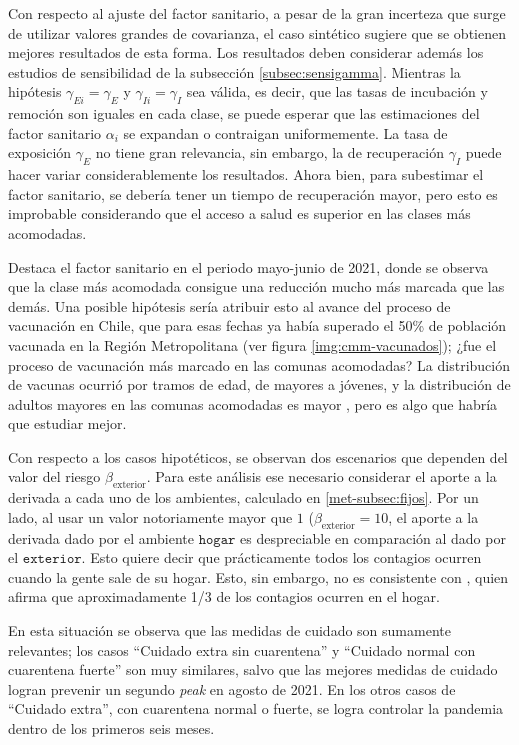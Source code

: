 Con respecto al ajuste del factor sanitario, a pesar de la gran incerteza que surge de utilizar valores grandes de covarianza, el caso sintético sugiere que se obtienen mejores resultados de esta forma. Los resultados deben considerar además los estudios de sensibilidad de la subsección \ref{subsec:sensigamma}. Mientras la hipótesis \(\gamma_{Ei} = \gamma_E\) y \(\gamma_{Ii} = \gamma_I\) sea válida, es decir, que las tasas de incubación y remoción son iguales en cada clase, se puede esperar que las estimaciones del factor sanitario \(\alpha_i\) se expandan o contraigan uniformemente. La tasa de exposición \(\gamma_E\) no tiene gran relevancia, sin embargo, la de recuperación \(\gamma_I\) puede hacer variar considerablemente los resultados. Ahora bien, para subestimar el factor sanitario, se debería tener un tiempo de recuperación mayor, pero esto es improbable considerando que el acceso a salud es superior en las clases más acomodadas.

Destaca el factor sanitario en el periodo mayo-junio de 2021, donde se observa que la clase más acomodada consigue una reducción mucho más marcada que las demás. Una posible hipótesis sería atribuir esto al avance del proceso de vacunación en Chile, que para esas fechas ya había superado el 50\% de población vacunada en la Región Metropolitana (ver figura \ref{img:cmm-vacunados}); ¿fue el proceso de vacunación más marcado en las comunas acomodadas? La distribución de vacunas ocurrió por tramos de edad, de mayores a jóvenes, y la distribución de adultos mayores en las comunas acomodadas es mayor \cite{LaTercera}, pero es algo que habría que estudiar mejor.

Con respecto a los casos hipotéticos, se observan dos escenarios que dependen del valor del riesgo \(\beta_{\text{exterior}}\). Para este análisis ese necesario considerar el aporte a la derivada a cada uno de los ambientes, calculado en \ref{met-subsec:fijos}. Por un lado, al usar un valor notoriamente mayor que \(1\) (\(\beta_{\text{exterior}} = 10\), el aporte a la derivada dado por el ambiente \(\texttt{hogar}\) es despreciable en comparación al dado por el \(\texttt{exterior}\). Esto quiere decir que prácticamente todos los contagios ocurren cuando la gente sale de su hogar. Esto, sin embargo, no es consistente con \cite{Ferguson2020}, quien afirma que aproximadamente 1/3 de los contagios ocurren en el hogar.

En esta situación se observa que las medidas de cuidado son sumamente relevantes; los casos ``Cuidado extra sin cuarentena'' y ``Cuidado normal con cuarentena fuerte'' son muy similares, salvo que las mejores medidas de cuidado logran prevenir un segundo \textit{peak} en agosto de 2021. En los otros casos de ``Cuidado extra'', con cuarentena normal o fuerte, se logra controlar la pandemia dentro de los primeros seis meses.


